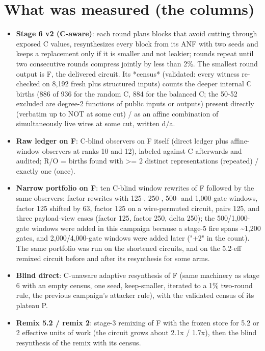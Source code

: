 \documentclass[10pt,a4paper]{article}
\begin{document}
\section{What was measured (the columns)}

\begin{itemize}
\item \textbf{Stage 6 v2 (C-aware)}: each round plans blocks that avoid cutting through exposed C values, resynthesizes every block from its ANF with two seeds and keeps a replacement only if it is smaller and not leakier; rounds repeat until two consecutive rounds compress jointly by less than 2\%. The smallest round output is F, the delivered circuit. Its *census* (validated: every witness re-checked on 8,192 fresh plus structured inputs) counts the deeper internal C births (886 of 936 for the random C, 884 for the balanced C; the 50-52 excluded are degree-2 functions of public inputs or outputs) present directly (verbatim up to NOT at some cut) /\allowbreak{} as an affine combination of simultaneously live wires at some cut, written d/\allowbreak{}a.
\item \textbf{Raw ledger on F}: C-blind observers on F itself (direct ledger plus affine-window observers at ranks 10 and 12), labeled against C afterwards and audited; R/\allowbreak{}O = births found with \textgreater{}= 2 distinct representations (repeated) /\allowbreak{} exactly one (once).
\item \textbf{Narrow portfolio on F}: ten C-blind window rewrites of F followed by the same observers: factor rewrites with 125-, 250-, 500- and 1,000-gate windows, factor 125 shifted by 63, factor 125 on a wire-permuted circuit, pairs 125, and three payload-view cases (factor 125, factor 250, delta 250); the 500/\allowbreak{}1,000-gate windows were added in this campaign because a stage-5 fire spans \textasciitilde{}1,200 gates, and 2,000/\allowbreak{}4,000-gate windows were added later ("+2" in the count). The same portfolio was run on the shortened circuits, and on the 5.2-eff remixed circuit before and after its resynthesis for some arms.
\item \textbf{Blind direct}: C-unaware adaptive resynthesis of F (same machinery as stage 6 with an empty census, one seed, keep-smaller, iterated to a 1\% two-round rule, the previous campaign's attacker rule), with the validated census of its plateau P.
\item \textbf{Remix 5.2 /\allowbreak{} remix 2}: stage-3 remixing of F with the frozen store for 5.2 or 2 effective units of work (the circuit grows about 2.1x /\allowbreak{} 1.7x), then the blind resynthesis of the remix with its census.

\end{itemize}
\end{document}
